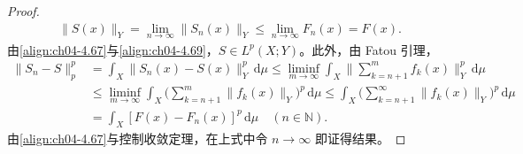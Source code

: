 \documentclass[../../main.tex]{subfiles}%
\begin{document}
\begin{proof}
\begin{align}
\|S(x)\|_Y=\lim_{n\to\infty}\|S_n(x)\|_Y\leqslant\lim_{n\to\infty}F_n(x)=F(x). \label{align:ch04-4.69}
\end{align}
由\eqref{align:ch04-4.67}与\eqref{align:ch04-4.69}，$S\in L^p(X;Y)$。此外，由 Fatou 引理，
\begin{align}
\|S_n-S\|_p^p&=\int_X\|S_n(x)-S(x)\|_Y^p\,\mathrm{d}\mu
\leqslant\liminf_{m\to\infty}\int_X\Big\|\sum_{k=n+1}^m f_k(x)\Big\|_Y^p\,\mathrm{d}\mu\nonumber\\
&\leqslant\liminf_{m\to\infty}\int_X\Big(\sum_{k=n+1}^m\|f_k(x)\|_Y\Big)^p\,\mathrm{d}\mu
\leqslant\int_X\Big(\sum_{k=n+1}^\infty\|f_k(x)\|_Y\Big)^p\,\mathrm{d}\mu\nonumber\\
&=\int_X[F(x)-F_n(x)]^p\,\mathrm{d}\mu\quad(n\in\mathbb{N}). \label{align:ch04-4.70}
\end{align}
由\eqref{align:ch04-4.67}与控制收敛定理，在上式中令 $n\to\infty$ 即证得结果。
\end{proof}
\end{document}
